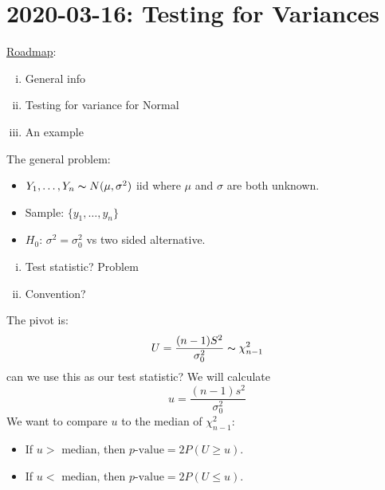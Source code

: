 \section{2020-03-16: Testing for Variances}
\underline{Roadmap}:
\begin{enumerate}[(i)]
    \item General info
    \item Testing for variance for Normal
    \item An example
\end{enumerate}
The general problem:
\begin{itemize}
    \item $ Y_1,\ldots ,Y_n \thicksim N(\mu,\sigma^2)$ iid
          where $ \mu $ and $ \sigma $ are both unknown.
    \item Sample: $ \{y_1,\ldots ,y_n\} $
    \item $ H_0 $: $ \sigma^2=\sigma_0^2 $ vs two sided alternative.
\end{itemize}

\begin{enumerate}[(i)]
    \item Test statistic? Problem
    \item Convention?
\end{enumerate}
The pivot is:
\[ U=\frac{(n-1)S^2}{\sigma_0^2} \thicksim \chi^2_{n-1} \]
can we use this as our test statistic? We will calculate
\[ u=\frac{(n-1)s^2}{\sigma_0^2} \]
We want to compare $ u $ to the median of $ \chi^2_{n-1} $:
\begin{itemize}
    \item If $ u> $ median, then $ p\text{-value}=2P(U\geqslant u) $.
    \item If $ u< $ median, then $ p\text{-value}=2P(U\leqslant u) $.
\end{itemize}


